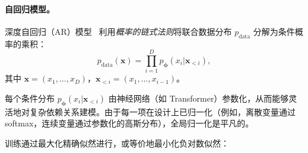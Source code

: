 \paragraph{自回归模型。}
深度自回归（AR）模型~\citep{frey1995does,larochelle2011neural,uria2016neural}
利用\emph{概率的链式法则}将联合数据分布 $p_{\mathrm{data}}$ 分解为条件概率的乘积：
\begin{equation*}
    p_{\mathrm{data}}(\mathbf{x}) = \prod_{i=1}^D p_{\bm{\phi}}(x_i |\mathbf{x}_{<i}),
\end{equation*}
其中 $\mathbf{x} = (x_1, \ldots, x_D)$，$\mathbf{x}_{<i} = (x_1, \ldots, x_{i-1})$。

每个条件分布 $p_{\bm{\phi}}(x_i |\mathbf{x}_{<i})$ 由神经网络（如 Transformer）参数化，从而能够灵活地对复杂依赖关系建模。由于每一项在设计上已归一化（例如，离散变量通过 softmax，连续变量通过参数化的高斯分布），全局归一化是平凡的。

训练通过最大化精确似然进行，或等价地最小化负对数似然：





